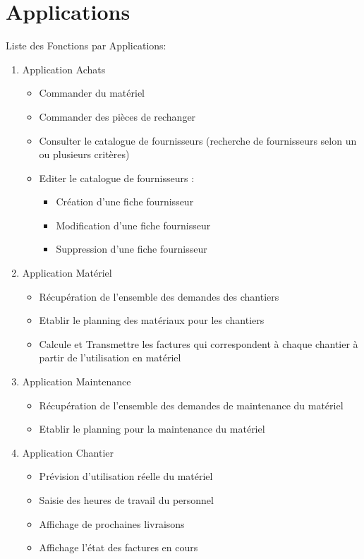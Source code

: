 \documentclass [a4paper] {report}
\begin{document}
\section{Applications}

Liste des Fonctions par Applications:

\begin{enumerate}

\item Application Achats
\begin{itemize}
\item Commander du matériel
\item Commander des pièces de rechanger
\item Consulter le catalogue de fournisseurs (recherche de fournisseurs selon 
un ou plusieurs critères)
\item Editer le catalogue de fournisseurs :
	\begin{itemize}
	\item Création d'une fiche fournisseur
	\item Modification d'une fiche fournisseur
	\item Suppression d'une fiche fournisseur
	\end{itemize}
\end{itemize}

\item Application Matériel
\begin{itemize}
\item Récupération de l'ensemble des demandes des chantiers
\item Etablir le planning des matériaux pour les chantiers
\item Calcule et Transmettre les factures qui correspondent à chaque chantier à partir de l'utilisation en matériel 
\end{itemize}

\item Application Maintenance
\begin{itemize}
\item Récupération de l'ensemble des demandes de maintenance du matériel
\item Etablir le planning pour la maintenance du matériel
\end{itemize}

\item Application Chantier
\begin{itemize}
\item Prévision d'utilisation réelle du matériel
\item Saisie des heures de travail du personnel
\item Affichage de prochaines livraisons
\item Affichage l'état des factures en cours
\end{itemize}

\end{enumerate}
\end{document}
